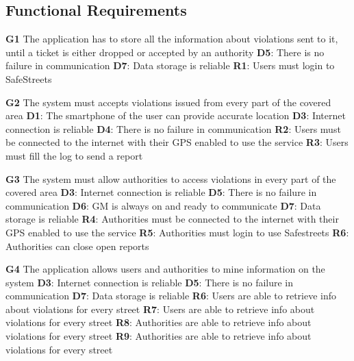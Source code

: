 \subsection{Functional Requirements}
\begin{outline}

    \1 \textbf{G1} The application has to store all the information about 
    violations sent to it, until a ticket is either dropped or accepted 
    by an authority
    \2 \textbf{D5}: There is no failure in communication
    \2 \textbf{D7}: Data storage is reliable
    \2 \textbf{R1}: Users must login to SafeStreets


    \1 \textbf{G2} The system must accepts violations issued from every 
    part of the covered area
    \2 \textbf{D1}: The smartphone of the user can provide accurate 
    location
    \2 \textbf{D3}: Internet connection is reliable
    \2 \textbf{D4}: There is no failure in communication
    \2 \textbf{R2}: Users must be connected to the internet with their 
    GPS enabled to use the service
    \2 \textbf{R3}: Users must fill the log to send a report

    
    \1 \textbf{G3} The system must allow authorities to access 
    violations in every part of the covered area
    \2 \textbf{D3}: Internet connection is reliable
    \2 \textbf{D5}: There is no failure in communication
    \2 \textbf{D6}: GM is always on and ready to communicate
    \2 \textbf{D7}: Data storage is reliable
    \2 \textbf{R4}: Authorities must be connected to the internet with 
    their GPS enabled to use the service
    \2 \textbf{R5}: Authorities must login to use Safestreets
    \2 \textbf{R6}: Authorities can close open reports 


    \1 \textbf{G4} The application allows users and authorities 
    to mine information on the system
    \2 \textbf{D3}: Internet connection is reliable
    \2 \textbf{D5}: There is no failure in communication
    \2 \textbf{D7}: Data storage is reliable
    \2 \textbf{R6}: Users are able to retrieve info about violations 
    for every street
    \2 \textbf{R7}: Users are able to retrieve info about violations 
    for every street
    \2 \textbf{R8}: Authorities are able to retrieve info about violations 
    for every street
    \2 \textbf{R9}: Authorities are able to retrieve info about violations 
    for every street


\end{outline}
